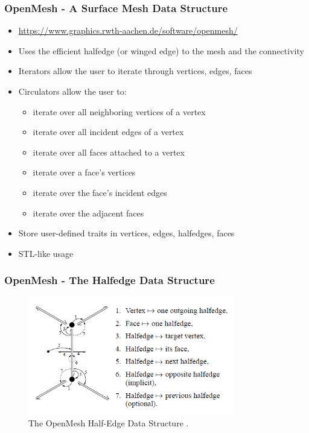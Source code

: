 \begin{frame}
\frametitle{OpenMesh - A Surface Mesh Data Structure}
\begin{itemize}
\item \url{https://www.graphics.rwth-aachen.de/software/openmesh/}
\item Uses the efficient halfedge (or winged edge) to the mesh and the connectivity
\item Iterators allow the user to iterate through vertices, edges, faces
\item Circulators allow the user to:
\begin{itemize}
\item iterate over all neighboring vertices of a vertex
\item iterate over all incident edges of a vertex
\item iterate over all faces attached to a vertex
\item iterate over a face's vertices
\item iterate over the face's incident edges
\item iterate over the adjacent faces
\end{itemize}
\item Store user-defined traits in vertices, edges, halfedges, faces	
\item STL-like usage
\end{itemize}								
\end{frame}

\begin{frame}
\frametitle{OpenMesh - The Halfedge Data Structure}
\begin{figure}[h!]
 \includegraphics[width=0.8\textwidth]{screenshots/half-edge.png}
\caption{The OpenMesh Half-Edge Data Structure \cite{Botsch02openmesh}.}
\end{figure}
\end{frame}

